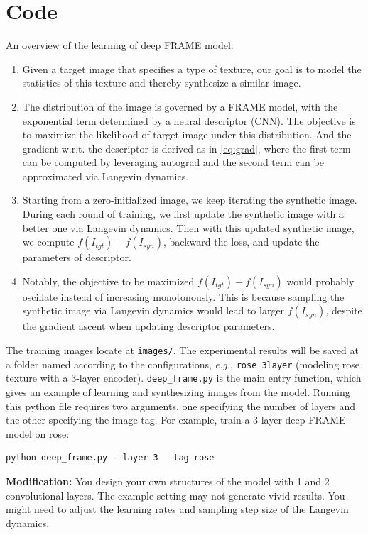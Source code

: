 \documentclass[11pt]{article}
\begin{document}
\section{Code}
An overview of the learning of deep FRAME model:
\begin{enumerate}
    \item Given a target image that specifies a type of texture, our goal is to model the statistics of this texture and thereby synthesize a similar image.
    \item The distribution of the image is governed by a FRAME model, with the exponential term determined by a neural descriptor (CNN). The objective is to maximize the likelihood of target image under this distribution. And the gradient w.r.t. the descriptor is derived as in \cref{eq:grad}, where the first term can be computed by leveraging autograd and the second term can be approximated via Langevin dynamics.
    \item Starting from a zero-initialized image, we keep iterating the synthetic image. During each round of training, we first update the synthetic image with a better one via Langevin dynamics. Then with this updated synthetic image, we compute $f(I_{tgt})-f(I_{syn})$, backward the loss, and update the parameters of descriptor.
    \item Notably, the objective to be maximized $f(I_{tgt})-f(I_{syn})$ would probably oscillate instead of increasing monotonously. This is because sampling the synthetic image via Langevin dynamics would lead to larger $f(I_{syn})$, despite the gradient ascent when updating descriptor parameters.
\end{enumerate}

The training images locate at \texttt{images/}. The experimental results will be saved at a folder named according to the configurations, \textit{e.g.}, \texttt{rose\_3layer} (modeling rose texture with a 3-layer encoder). \texttt{deep\_frame.py} is the main entry function, which gives an example of learning and synthesizing images from the model. Running this python file requires two arguments, one specifying the number of layers and the other specifying the image tag. For example, train a 3-layer deep FRAME model on rose:
\begin{lstlisting}
python deep_frame.py --layer 3 --tag rose
\end{lstlisting}

\textbf{Modification:} You design your own structures of the model with 1 and 2 convolutional layers. The example setting may not generate vivid results. You might need to adjust the learning rates and sampling step size of the Langevin dynamics.
\end{document}
